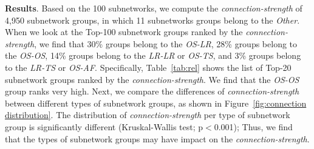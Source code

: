 \documentclass[sigconf]{acmart}
\begin{document}
\smallskip
\noindent\textbf{Results}. 
Based on the 100 subnetworks, we compute the \emph{connection-strength} %
of 4,950 subnetwork groups, in which 11 subnetworks groups belong to the \emph{Other}. 
When we look at the Top-100 subnetwork groups ranked by the \emph{connection-strength}, we find that 30\% groups belong to the \emph{OS-LR}, 
28\% groups belong to the \emph{OS-OS}, 14\% groups belong to the \emph{LR-LR} or \emph{OS-TS}, and 3\% groups belong to the \emph{LR-TS} or \emph{OS-AF}.  
Specifically, Table~\ref{tab:rel} shows the list of Top-20 subnetwork groups ranked by the \emph{connection-strength}. We find that the \emph{OS-OS} group ranks very high. 
Next, we compare the differences of \emph{connection-strength} between different types of subnetwork groups, as shown in Figure~\ref{fig:connection distribution}. 
The distribution of \emph{connection-strength} per type of subnetwork group is significantly different (Kruskal-Wallis test; p$<$0.001); Thus, we find that the types of subnetwork groups may have impact on the \emph{connection-strength}. 


\end{document}
